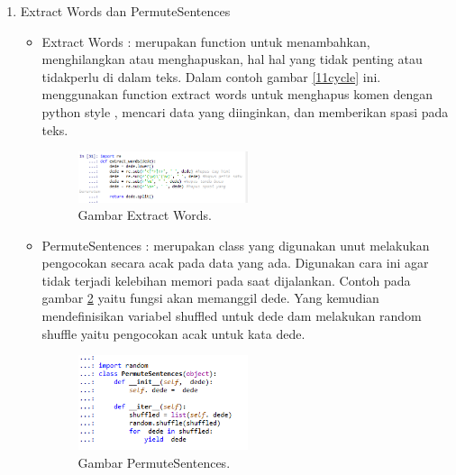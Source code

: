 \begin{enumerate}
\begin{itemize}
		\end{itemize}
\item Extract Words dan PermuteSentences
	\begin{itemize}
	\item Extract Words : merupakan function untuk menambahkan, menghilangkan atau menghapuskan, hal hal yang tidak penting atau tidakperlu di dalam teks. Dalam contoh gambar \ref{11cycle} ini. menggunakan function extract words untuk menghapus komen dengan python style , mencari data yang diinginkan, dan memberikan spasi pada teks.
		\begin{figure}[ht]
		\centerline{\includegraphics[width=0.5\textwidth]{figures/chapter5/14extract.png}}
		\caption{Gambar Extract Words.}	
		\label{14extract}
		\end{figure}
	\item PermuteSentences : merupakan class yang digunakan unut melakukan pengocokan secara acak pada data yang ada. Digunakan cara ini agar tidak terjadi kelebihan memori pada saat dijalankan. Contoh pada gambar \ref{15permute} yaitu fungsi akan memanggil dede. Yang kemudian mendefinisikan variabel shuffled untuk dede dam melakukan random shuffle yaitu pengocokan acak untuk kata dede.
 		\begin{figure}[ht]
		\centerline{\includegraphics[width=0.5\textwidth]{figures/chapter5/15permute.png}}
		\caption{Gambar PermuteSentences.}	
		\label{15permute}
		\end{figure}
	\end{itemize}


\end{enumerate}